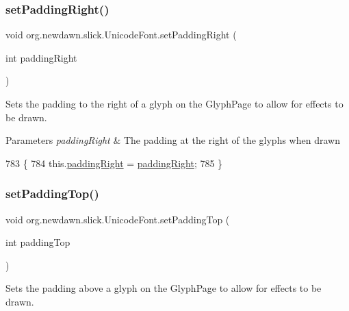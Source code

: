 \subsubsection{\texorpdfstring{set\+Padding\+Right()}{setPaddingRight()}}
{\footnotesize\ttfamily void org.\+newdawn.\+slick.\+Unicode\+Font.\+set\+Padding\+Right (\begin{DoxyParamCaption}\item[{int}]{padding\+Right }\end{DoxyParamCaption})\hspace{0.3cm}{\ttfamily [inline]}}

Sets the padding to the right of a glyph on the Glyph\+Page to allow for effects to be drawn.


\begin{DoxyParams}{Parameters}
{\em padding\+Right} & The padding at the right of the glyphs when drawn \\
\hline
\end{DoxyParams}

\begin{DoxyCode}
783                                                    \{
784         this.\mbox{\hyperlink{classorg_1_1newdawn_1_1slick_1_1_unicode_font_ac488d6ccaeeb1d846fb5fc796a4e4ff2}{paddingRight}} = \mbox{\hyperlink{classorg_1_1newdawn_1_1slick_1_1_unicode_font_ac488d6ccaeeb1d846fb5fc796a4e4ff2}{paddingRight}};
785     \}
\end{DoxyCode}
\mbox{\label{classorg_1_1newdawn_1_1slick_1_1_unicode_font_afae348ec73cbc25c919dc92c8d65784d}} 
\subsubsection{\texorpdfstring{set\+Padding\+Top()}{setPaddingTop()}}
{\footnotesize\ttfamily void org.\+newdawn.\+slick.\+Unicode\+Font.\+set\+Padding\+Top (\begin{DoxyParamCaption}\item[{int}]{padding\+Top }\end{DoxyParamCaption})\hspace{0.3cm}{\ttfamily [inline]}}

Sets the padding above a glyph on the Glyph\+Page to allow for effects to be drawn.


